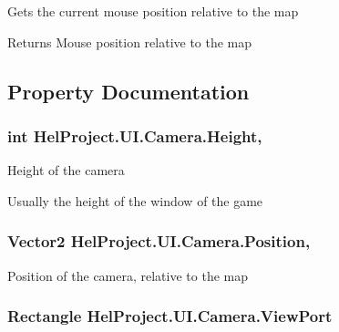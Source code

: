 Gets the current mouse position relative to the map 

\begin{DoxyReturn}{Returns}
Mouse position relative to the map
\end{DoxyReturn}


\subsection{Property Documentation}
\hypertarget{class_hel_project_1_1_u_i_1_1_camera_af050fd0946ed11d3c997d7fa2a461571}{}
\subsubsection[{Height}]{\setlength{\rightskip}{0pt plus 5cm}int Hel\+Project.\+U\+I.\+Camera.\+Height\hspace{0.3cm}{\ttfamily [get]}, {\ttfamily [set]}}\label{class_hel_project_1_1_u_i_1_1_camera_af050fd0946ed11d3c997d7fa2a461571}


Height of the camera 

Usually the height of the window of the game \hypertarget{class_hel_project_1_1_u_i_1_1_camera_abe879707e0bdcebf2e1c9a4e21440876}{}
\subsubsection[{Position}]{\setlength{\rightskip}{0pt plus 5cm}Vector2 Hel\+Project.\+U\+I.\+Camera.\+Position\hspace{0.3cm}{\ttfamily [get]}, {\ttfamily [set]}}\label{class_hel_project_1_1_u_i_1_1_camera_abe879707e0bdcebf2e1c9a4e21440876}


Position of the camera, relative to the map 

\hypertarget{class_hel_project_1_1_u_i_1_1_camera_a95599103c122a9b40fb225603788b6ed}{}
\subsubsection[{View\+Port}]{\setlength{\rightskip}{0pt plus 5cm}Rectangle Hel\+Project.\+U\+I.\+Camera.\+View\+Port\hspace{0.3cm}{\ttfamily [get]}}\label{class_hel_project_1_1_u_i_1_1_camera_a95599103c122a9b40fb225603788b6ed}



